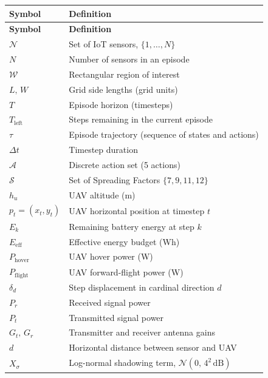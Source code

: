 \begin{longtable}{ll}
    \toprule
    \textbf{Symbol} & \textbf{Definition} \\
    \midrule
    \endfirsthead
    \toprule
    \textbf{Symbol} & \textbf{Definition} \\
    \midrule
    \endhead
    \bottomrule
    \endfoot
    $\mathcal{N}$           & Set of IoT sensors, $\{1, \ldots, N\}$ \\
    $N$                     & Number of sensors in an episode \\
    $\mathcal{W}$           & Rectangular region of interest \\
    $L,\,W$                 & Grid side lengths (grid units) \\
    $T$                     & Episode horizon (timesteps) \\
    $T_{\mathrm{left}}$     & Steps remaining in the current episode \\
    $\tau$                  & Episode trajectory (sequence of states and actions) \\
    $\Delta t$              & Timestep duration \\
    $\mathcal{A}$           & Discrete action set (5 actions) \\
    $\mathcal{S}$           & Set of Spreading Factors $\{7, 9, 11, 12\}$ \\
    $h_u$                   & UAV altitude (m) \\
    $p_t = (x_t, y_t)$     & UAV horizontal position at timestep $t$ \\
    $E_k$                   & Remaining battery energy at step $k$ \\
    $E_{\mathrm{eff}}$      & Effective energy budget (Wh) \\
    $P_{\mathrm{hover}}$    & UAV hover power (W) \\
    $P_{\mathrm{flight}}$   & UAV forward-flight power (W) \\
    $\delta_d$              & Step displacement in cardinal direction $d$ \\
    $P_r$                   & Received signal power \\
    $P_t$                   & Transmitted signal power \\
    $G_t,\,G_r$             & Transmitter and receiver antenna gains \\
    $d$                     & Horizontal distance between sensor and UAV \\
    $X_\sigma$              & Log-normal shadowing term, $\mathcal{N}(0,\,4^2\,\mathrm{dB})$ \\

\end{longtable}
